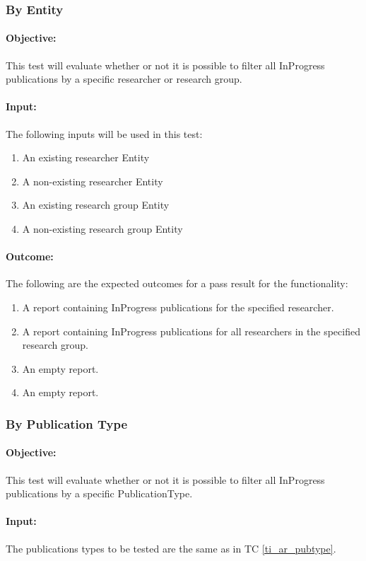\subsubsection{By Entity} \label{ti_sr_entity}
\paragraph{Objective:}
This test will evaluate whether or not it is possible to filter all InProgress publications by a specific researcher or research group.
\paragraph{Input:}
The following inputs will be used in this test:
\begin{enumerate}
	\item An existing researcher Entity
	\item A non-existing researcher Entity
	\item An existing research group Entity
	\item A non-existing research group Entity
\end{enumerate}
\paragraph{Outcome:}
The following are the expected outcomes for a pass result for the functionality:
\begin{enumerate}
	\item A report containing InProgress publications for the specified researcher.
	\item A report containing InProgress publications for all researchers in the specified research group.
	\item An empty report.
	\item An empty report.
\end{enumerate}


\subsubsection{By Publication Type} \label{ti_sr_pubtype}
\paragraph{Objective:}
This test will evaluate whether or not it is possible to filter all InProgress publications by a specific PublicationType.
\paragraph{Input:}
The publications types to be tested are the same as in TC \ref{ti_ar_pubtype}.
